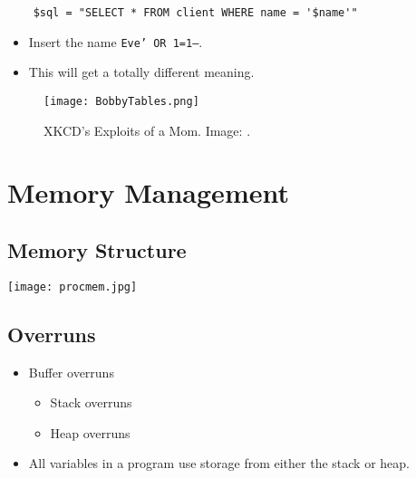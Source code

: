 
\begin{frame}[fragile]
  \begin{verbatim}
    $sql = "SELECT * FROM client WHERE name = '$name'"
  \end{verbatim}
  \begin{itemize}
    \item Insert the name \texttt{Eve' OR 1=1--}.
    \item This will get a totally different meaning.
  \end{itemize}
\end{frame}

\begin{frame}
  \begin{figure}
    \centering
    \texttt{[image: BobbyTables.png]}
    \caption{%
      XKCD's Exploits of a Mom.
      Image: \cite{BobbyTables}.
    }
  \end{figure}
\end{frame}


\section{Memory Management}

\subsection{Memory Structure}

\begin{frame}
  \texttt{[image: procmem.jpg]}
\end{frame}

\subsection{Overruns}

\begin{frame}
  \begin{itemize}
    \item Buffer overruns
      \begin{itemize}
        \item Stack overruns
        \item Heap overruns
      \end{itemize}

    \item All variables in a program use storage from either the stack or heap.
  \end{itemize}
\end{frame}

